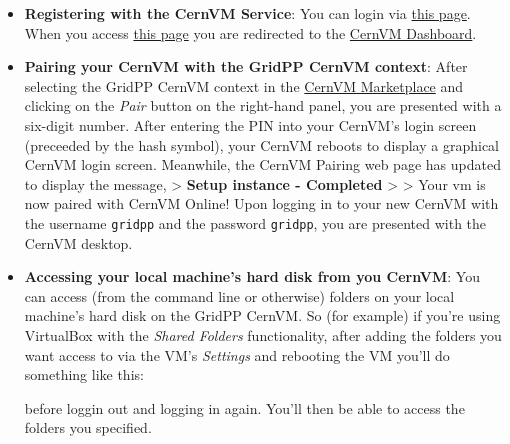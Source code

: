 \begin{itemize}
\item
  \textbf{Registering with the CernVM Service}: You can login via
  \href{https://cernvm-online.cern.ch/user/login}{this page}. When you
  access \href{https://cernvm-online.cern.ch/}{this page} you are
  redirected to the
  \href{https://cernvm-online.cern.ch/dashboard}{CernVM Dashboard}.
\item
  \textbf{Pairing your CernVM with the GridPP CernVM context}: After
  selecting the GridPP CernVM context in the
  \href{https://cernvm-online.cern.ch/market/list}{CernVM Marketplace}
  and clicking on the \emph{Pair} button on the right-hand panel, you
  are presented with a six-digit number. After entering the PIN into
  your CernVM's login screen (preceeded by the hash symbol), your CernVM
  reboots to display a graphical CernVM login screen. Meanwhile, the
  CernVM Pairing web page has updated to display the message,
  \textgreater{} \textbf{Setup instance - Completed} \textgreater{}
  \textgreater{} Your vm is now paired with CernVM Online! Upon logging
  in to your new CernVM with the username \texttt{gridpp} and the
  password \texttt{gridpp}, you are presented with the CernVM desktop.
\item
  \textbf{Accessing your local machine's hard disk from you CernVM}: You
  can access (from the command line or otherwise) folders on your local
  machine's hard disk on the GridPP CernVM. So (for example) if you're
  using VirtualBox with the \emph{Shared Folders} functionality, after
  adding the folders you want access to via the VM's \emph{Settings} and
  rebooting the VM you'll do something like this:

\begin{Shaded}
\begin{Highlighting}[]
\NormalTok{$ } 
\NormalTok{[}\NormalTok{] password for gridpp: }
\end{Highlighting}
\end{Shaded}

  before loggin out and logging in again. You'll then be able to access
  the folders you specified.

\begin{Shaded}
\begin{Highlighting}[]
\NormalTok{$ } 
\NormalTok{$ }
 
\end{Highlighting}
\end{Shaded}
\end{itemize}
